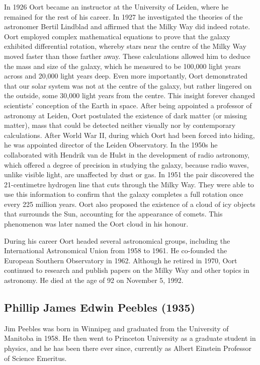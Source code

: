 In 1926 Oort became an instructor at the University of Leiden, where he remained for the rest of his career. In 1927 he investigated the theories of the astronomer Bertil Lindblad and affirmed that the Milky Way did indeed rotate. Oort employed complex mathematical equations to prove that the galaxy exhibited differential rotation, whereby stars near the centre of the Milky Way moved faster than those farther away. These calculations allowed him to deduce the mass and size of the galaxy, which he measured to be 100,000 light years across and 20,000 light years deep. Even more importantly, Oort demonstrated that our solar system was not at the centre of the galaxy, but rather lingered on the outside, some 30,000 light years from the centre. This insight forever changed scientists' conception of the Earth in space. After being appointed a professor of astronomy at Leiden, Oort postulated the existence of dark matter (or missing matter), mass that could be detected neither visually nor by contemporary calculations.
After World War II, during which Oort had been forced into hiding, he was appointed director of the Leiden Observatory. In the 1950s he collaborated with Hendrik van de Hulst in the development of radio astronomy, which offered a degree of precision in studying the galaxy, because radio waves, unlike visible light, are unaffected by dust or gas. In 1951 the pair discovered the 21-centimetre hydrogen line that cuts through the Milky Way. They were able to use this information to confirm that the galaxy completes a full rotation once every 225 million years. Oort also proposed the existence of a cloud of icy objects that surrounds the Sun, accounting for the appearance of comets. This phenomenon was later named the Oort cloud in his honour.

During his career Oort headed several astronomical groups, including the International Astronomical Union from 1958 to 1961. He co-founded the European Southern Observatory in 1962. Although he retired in 1970, Oort continued to research and publish papers on the Milky Way and other topics in astronomy. He died at the age of 92 on November 5, 1992.

\subsection[Jim \scshape{Peebles}]{Phillip James Edwin Peebles (1935)}\label{bio:peebles}
Jim Peebles was born in Winnipeg and graduated from the University of Manitoba in 1958. He then went to Princeton University as a graduate student in physics, and he has been there ever since, currently as Albert Einstein Professor of Science Emeritus.

